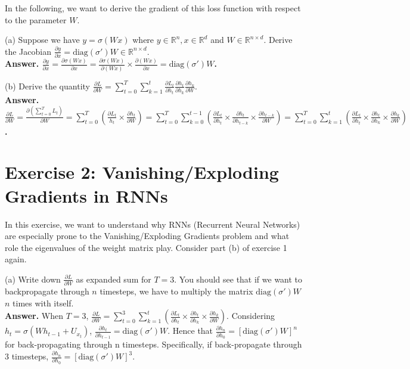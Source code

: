 \documentclass[12pt]{article}
\begin{document}
In the following, we want to derive the gradient of this loss function with respect to the parameter $W$.

(a) Suppose we have $y=\sigma(Wx)$ where $y\in \mathbb{R}^n, x\in \mathbb{R}^d$ and $W \in \mathbb{R}^{n \times d}$. Derive the Jacobian $\frac{\partial y}{\partial x} = \mathrm{diag}(\sigma') W \in \mathbb{R}^{n \times d}$.\\

\textbf{\textcolor{ans}{Answer. $\frac{\partial y}{\partial x}=\frac{\partial\sigma(Wx)}{\partial x}=\frac{\partial \sigma(Wx)}{\partial (Wx)}\times \frac{\partial (Wx)}{\partial x}=\mathrm{diag}(\sigma')W$}.\\}

(b) Derive the quantity $\frac{\partial L}{\partial W} = \sum_{t=0}^T \sum_{k=1}^t \frac{\partial L_t}{\partial h_t} \frac{\partial h_t}{\partial h_k} \frac{\partial h_k}{\partial W}$. \\

\textbf{\textcolor{ans}{Answer. $\frac{\partial L}{\partial W}=\frac{\partial(\sum_{t=0}^T L_t)}{\partial W}=\sum_{t=0}^T (\frac{\partial L_t}{h_t}\times  \frac{\partial h_t}{\partial W})=\sum_{t=0}^T\sum_{k=0}^{t-1}(\frac{\partial L_t}{\partial h_t}\times \frac{\partial h_t}{\partial h_{t-k}}\times \frac{\partial h_{t-k}}{\partial W})=\sum_{t=0}^T\sum_{k=1}^{t}(\frac{\partial L_t}{\partial h_t}\times \frac{\partial h_t}{\partial h_{k}}\times \frac{\partial h_k}{\partial W})$}.\\}

\clearpage
\section{\begingroup \large Exercise 2: Vanishing/Exploding Gradients in RNNs \endgroup}

\noindent In this exercise, we want to understand why RNNs (Recurrent Neural Networks) are especially prone to the Vanishing/Exploding Gradients problem and what role the eigenvalues of the weight matrix play. Consider part (b) of exercise 1 again.

(a) Write down $\frac{\partial L}{\partial W}$ as expanded sum for $T = 3$. You should see that if we want to backpropagate through $n$ timesteps, we have to multiply the matrix $\mathrm{diag}(\sigma')W$ $n$ times with itself.\\

\textcolor{ans}{\textbf{Answer.} When $T=3$, $\frac{\partial L}{\partial W}=\sum_{t=0}^3\sum_{k=1}^{t}(\frac{\partial L_t}{\partial h_t}\times \frac{\partial h_t}{\partial h_{k}}\times \frac{\partial h_k}{\partial W})$. Considering $h_t=\sigma(Wh_{t-1}+U_{x_t})$,  $\frac{\partial h_t}{\partial h_{t-1}}=\mathrm{diag}(\sigma')W$. Hence that $\frac{\partial h_n}{\partial h_0}={[\mathrm{diag}(\sigma')W]}^n$ for back-propagating through n timesteps. Specifically, if back-propagate through 3 timesteps, $\frac{\partial h_n}{\partial h_0}={[\mathrm{diag}(\sigma')W]}^3$.}\\
\end{document}
